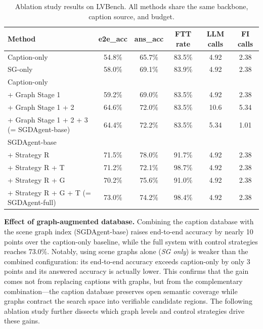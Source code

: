 \documentclass[sigconf, screen, review, anonymous]{acmart}
\begin{document}
\begin{table}[t]
  \centering
  \caption{Ablation study results on LVBench. All methods share the same backbone, caption source, and budget.}
  \label{tab:full_ablation}
  \begin{tabular}{lccccc}
    \toprule
    Method & e2e\_acc & ans\_acc & FTT rate & LLM calls & FI calls \\
    \midrule
    Caption-only              & 54.8\% & 65.7\% & 83.5\% & 4.92   & 2.38   \\
    SG-only                   & 58.0\% & 69.1\% & 83.9\% & 4.92   & 2.38  \\
    \midrule
    Caption-only \\
    + Graph Stage 1                   & 59.2\% & 69.0\% & 83.5\%    & 4.92   & 2.38   \\
    + Graph Stage 1 + 2               & 64.6\% & 72.0\% & 83.5\%    & 10.6   & 5.34   \\
    + Graph Stage 1 + 2 + 3 (= SGDAgent-base)          & 64.4\% & 72.2\% & 83.5\%        & 5.34   & 1.01   \\
    \midrule
    SGDAgent-base        \\
    + Strategy R              & 71.5\% & 78.0\% & 91.7\% & 4.92   & 2.38   \\
    + Strategy R + T          & 71.2\% & 72.1\% & 98.7\% & 4.92   & 2.38  \\
    + Strategy R + G          & 70.2\% & 75.6\% & 91.0\% & 4.92   & 2.38 \\
    + Strategy R + G + T (= SGDAgent-full)      & 73.0\% & 74.2\% & 98.4\% & 4.92   & 2.38  \\
    \bottomrule
  \end{tabular}
\end{table}


\textbf{Effect of graph-augmented database.}\quad
Combining the caption database with the scene graph index (SGDAgent-base) raises
end-to-end accuracy by nearly 10 points over the caption-only baseline,
while the full system with control strategies reaches 73.0\%.  Notably,
using scene graphs alone (\emph{SG only}) is weaker than the combined
configuration: its end-to-end accuracy exceeds caption-only by only
3 points and its answered accuracy is actually lower.  This confirms that
the gain comes not from replacing captions with graphs, but from the
complementary combination---the caption database preserves open semantic
coverage while graphs contract the search space into verifiable candidate
regions.  The following ablation study further dissects which graph levels
and control strategies drive these gains.
\end{document}
